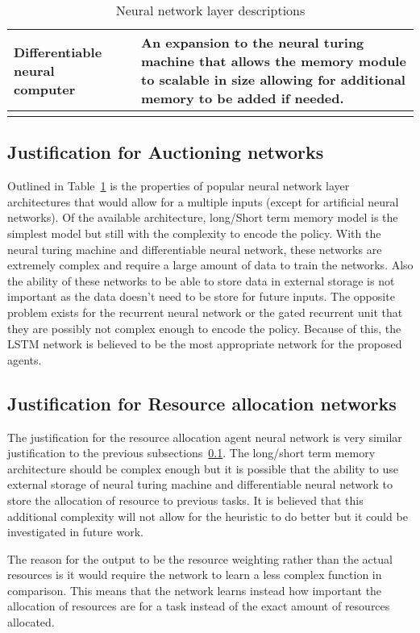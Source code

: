 \begin{longtable}{|p{3.5cm}|p{11cm}|}
    Differentiable neural computer~\citep{DNC} & An expansion to the neural turing machine that allows the memory
        module to scalable in size allowing for additional memory to be added if needed. \\ \hline
    \caption{Neural network layer descriptions}
    \label{tab:neural_network_layers}
\end{longtable}

\subsection{Justification for Auctioning networks}\label{subsec:justification-for-auctioning-networks}
Outlined in Table~\ref{tab:neural_network_layers} is the properties of popular neural network layer architectures that
would allow for a multiple inputs (except for artificial neural networks). Of the available architecture, long/Short
term memory model is the simplest model but still with the complexity to encode the policy. With the neural turing
machine and differentiable neural network, these networks are extremely complex and require a large amount of data to
train the networks. Also the ability of these networks to be able to store data in external storage is not important as
the data doesn't need to be store for future inputs. The opposite problem exists for the recurrent neural network or
the gated recurrent unit that they are possibly not complex enough to encode the policy. Because of this, the LSTM
network is believed to be the most appropriate network for the proposed agents.

\subsection{Justification for Resource allocation networks}\label{subsec:justification-for-resource-allocation-networks}
The justification for the resource allocation agent neural network is very similar justification to the previous
subsections~\ref{subsec:justification-for-auctioning-networks}. The long/short term memory architecture should be
complex enough but it is possible that the ability to use external storage of neural turing machine and differentiable
neural network to store the allocation of resource to previous tasks. It is believed that this additional complexity
will not allow for the heuristic to do better but it could be investigated in future work.

The reason for the output to be the resource weighting rather than the actual resources is it would require the network
to learn a less complex function in comparison. This means that the network learns instead how important the allocation
of resources are for a task instead of the exact amount of resources allocated.